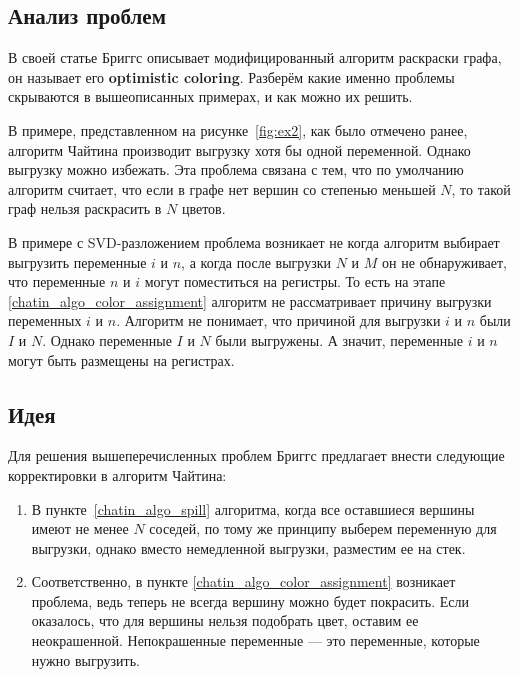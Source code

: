 \subsection{Анализ проблем}

В своей статье Бриггс описывает модифицированный алгоритм раскраски графа, он называет его \textbf{optimistic coloring}.
Разберём какие именно проблемы скрываются в вышеописанных примерах, и как можно их решить.

В примере, представленном на рисунке~\ref{fig:ex2}, как было отмечено ранее, алгоритм Чайтина производит выгрузку хотя бы одной переменной.
Однако выгрузку можно избежать.
Эта проблема связана с тем, что по умолчанию алгоритм считает, что если в графе нет вершин со степенью меньшей $N$,
то такой граф нельзя раскрасить в $N$ цветов.


В примере с SVD-разложением проблема возникает не когда алгоритм выбирает выгрузить переменные $i$ и $n$, а когда
после выгрузки $N$ и $M$ он не обнаруживает, что переменные $n$ и $i$ могут поместиться на регистры.
То есть на этапе \ref{chatin_algo_color_assignment} алгоритм не рассматривает причину выгрузки
переменных $i$ и $n$.
Алгоритм не понимает, что причиной для выгрузки $i$ и $n$ были $I$ и $N$.
Однако переменные $I$ и $N$ были выгружены.
А значит, переменные $i$ и $n$ могут быть размещены на регистрах.

\subsection{Идея}

Для решения вышеперечисленных проблем Бриггс предлагает внести следующие корректировки в алгоритм Чайтина:

\begin{enumerate}
    \item В пункте~\ref{chatin_algo_spill} алгоритма, когда все оставшиеся вершины имеют не менее $N$ соседей,
    по тому же принципу выберем переменную для выгрузки, однако вместо немедленной выгрузки, разместим ее на стек. \label{briggs_change_spill}

    \item Соответственно, в пункте \ref{chatin_algo_color_assignment} возникает проблема, ведь теперь не всегда
    вершину можно будет покрасить.
    Если оказалось, что для вершины нельзя подобрать цвет, оставим ее неокрашенной.
    Непокрашенные переменные --- это переменные, которые нужно выгрузить.
    
\end{enumerate}


